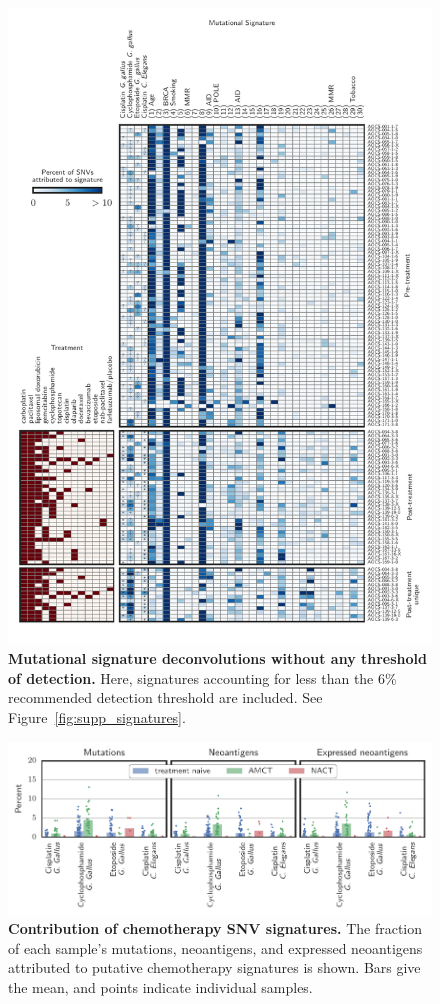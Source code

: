 \begin{figure}
\centering
\includegraphics[scale=1.0]{figures/supplementary_signatures_no_cutoff.pdf}
\caption{\textbf{Mutational signature deconvolutions without any threshold of detection.} Here, signatures accounting for less than the 6\% recommended detection threshold are included. See Figure~\ref{fig:supp_signatures}.}
\label{fig:supplementary_signatures_no_cutoff.pdf}
\end{figure}

\begin{figure}[htbp]
\centering
\includegraphics[scale=1.0]{figures/sources_of_mutations_and_neoantigens_ungrouped.pdf}
\caption{\textbf{Contribution of chemotherapy SNV signatures.} The fraction of each sample's mutations, neoantigens, and expressed neoantigens attributed to putative chemotherapy signatures is shown. Bars give the mean, and points indicate individual samples.}
\label{fig:sourcesungrouped}
\end{figure}

\FloatBarrier
